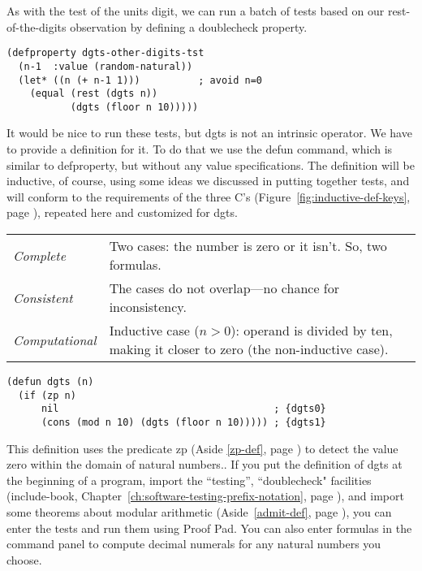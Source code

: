 As with the test of the units digit,
we can run a batch of tests based on our rest-of-the-digits
observation by defining a doublecheck property.
\begin{Verbatim}
(defproperty dgts-other-digits-tst
  (n-1  :value (random-natural))
  (let* ((n (+ n-1 1)))          ; avoid n=0
    (equal (rest (dgts n))
           (dgts (floor n 10)))))
\end{Verbatim}

It would be nice to run these tests, but dgts is not an intrinsic operator.
We have to provide a definition for it.
To do that we use the defun command, which is similar to defproperty,
but without any value specifications. The definition will be inductive,
of course, using some ideas we discussed in putting together tests,
and will conform to the requirements of the three C's
(Figure~\ref{fig:inductive-def-keys}, page \pageref{fig:inductive-def-keys}),
repeated here and customized for dgts.
\begin{samepage}
\begin{center}
\begin{tabular}{lp{3.5in}}
\emph{Complete}      & Two cases: the number is zero or it isn't. So, two formulas.\\
\emph{Consistent}    & The cases do not overlap---no chance for inconsistency.\\
\emph{Computational} & Inductive case ($n > 0$): operand is
                       divided by ten, making it closer to zero
                       (the non-inductive case).
\end{tabular}
\end{center}
\end{samepage}

\label{dgts-defun}
\begin{Verbatim}
(defun dgts (n)
  (if (zp n)
      nil                                     ; {dgts0}
      (cons (mod n 10) (dgts (floor n 10))))) ; {dgts1}
\end{Verbatim}

This definition uses the predicate zp (Aside \ref{zp-def}, page \pageref{zp-def})
to detect the value zero within the domain of natural numbers..
If you put the definition of dgts at the beginning of a program,
import the ``testing'', ``doublecheck" facilities
(include-book,
Chapter~\ref{ch:software-testing-prefix-notation}, page \pageref{ch:software-testing-prefix-notation}),
and import some theorems about modular arithmetic
(Aside~\ref{admit-def}, page \pageref{admit-def}),
you can enter the tests and run them using Proof Pad.
You can also enter formulas in the command panel to compute
decimal numerals for any natural numbers you choose.

